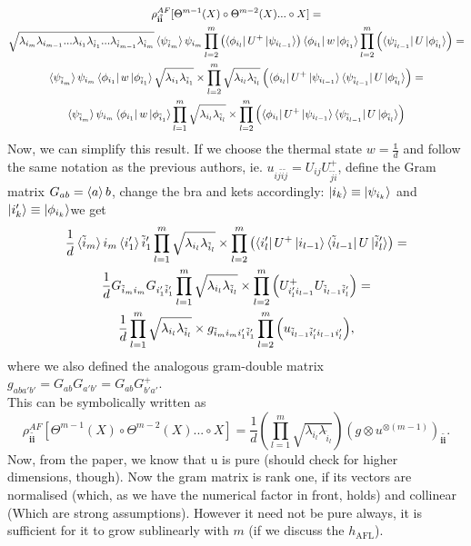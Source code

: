 \documentclass{article}
\newcommand{\afl}{h_{\text{AFL}}}
\begin{document}
\begin{multline}
\rho_{\mathbf{i}\mathbf{\tilde{i}}}^{AF}
[\Theta^{m-1}(X)\circ\Theta^{m-2}(X)...\circ X]
= \\
\sqrt{
\lambda_{i_m}\lambda_{i_{m-1}}...\lambda_{i_1}
\lambda_{\tilde{i}_1}...
\lambda_{\tilde{i}_{m-1}}
\lambda_{\tilde{i}_m}
}
\braket{\psi_{\tilde{i}_m}}{\psi_{i_m}}
\prod_{l=2}^m{\left(\bra{\phi_{i_l}}U^+\ket{\psi_{i_{l-1}}}\right)}
\bra{\phi_{i_1}}w\ket{\phi_{\tilde{i}_1}}
\prod_{l=2}^m{\left(\bra{\psi_{\tilde{i}_{l-1}}}U\ket{\phi_{\tilde{i}_l}}\right)} 
=\\
\braket{\psi_{\tilde{i}_m}}{\psi_{i_m}}
\bra{\phi_{i_1}}w\ket{\phi_{\tilde{i}_1}}
\sqrt{\lambda_{i_1}\lambda_{\tilde{i}_1}} \times\prod_{l=2}^m{\sqrt{\lambda_{i_l}\lambda_{\tilde{i}_l}}\left(\bra{\phi_{i_l}}U^+\ket{\psi_{i_{l-1}}}\bra{\psi_{\tilde{i}_{l-1}}}U\ket{\phi_{\tilde{i}_l}}\right)} = 
\\
\braket{\psi_{\tilde{i}_m}}{\psi_{i_m}}
\bra{\phi_{i_1}}w\ket{\phi_{\tilde{i}_1}}
\prod_{l=1}^m{\sqrt{\lambda_{i_l}\lambda_{\tilde{i}_l}}}\times\prod_{l=2}^m{\left(\bra{\phi_{i_l}}U^+\ket{\psi_{i_{l-1}}}\bra{\psi_{\tilde{i}_{l-1}}}U\ket{\phi_{\tilde{i}_l}}\right)}
\end{multline}
Now, we can simplify this result. If we choose the thermal state $w=\frac{\mathbb{1}}{d}$ and follow the same notation as the previous authors, ie. $u_{ij\tilde{i}\tilde{j}} = U_{ij}U^+_{\tilde{j}\tilde{i}}$, define the Gram matrix $G_{ab} = \braket{a}{b}$, change the bra and kets accordingly: $\ket{i_k}\equiv \ket{\psi_{i_{k}}}$ and $\ket{i_k'}\equiv \ket{\phi_{i_{k}}}$we get
\begin{multline}
\frac{1}{d}\braket{\tilde{i}_m}{i_m}
\braket{i_1'}{\tilde{i}_1'}
\prod_{l=1}^m{\sqrt{\lambda_{i_l}\lambda_{\tilde{i}_l}}}\times\prod_{l=2}^m{\left(\bra{i_l'}U^+\ket{i_{l-1}}\bra{\tilde{i}_{l-1}}U\ket{\tilde{i}_l'}\right)} = \\
\frac{1}{d}G_{\tilde{i}_mi_m}
G_{i_1'\tilde{i}_1'}
\prod_{l=1}^m{\sqrt{\lambda_{i_l}\lambda_{\tilde{i}_l}}}\times\prod_{l=2}^m{\left(U^+_{i_l'i_{l-1}}U_{\tilde{i}_{l-1}\tilde{i}_l'}\right)} = \\
\frac{1}{d}\prod_{l=1}^m{\sqrt{\lambda_{i_l}\lambda_{\tilde{i}_l}}}\times g_{\tilde{i}_mi_mi_1'\tilde{i}_1'}
\prod_{l=2}^m{\left(u_{\tilde{i}_{l-1}\tilde{i}_l'i_{l-1}i_l'}\right)},
\end{multline}
where we also defined the analogous gram-double matrix $g_{aba'b'} = G_{ab}G_{a'b'} = G_{ab}G^+_{b'a'}$. \\
This can be symbolically written as
\begin{equation}
\rho_{\mathbf{i}\mathbf{\tilde{i}}}^{AF}
[\Theta^{m-1}(X)\circ\Theta^{m-2}(X)...\circ X]
=\frac{1}{d}\left(\prod_{l=1}^m{\sqrt{\lambda_{i_l}\lambda_{\tilde{i}_l}}}\right)(g\otimes u^{\otimes(m-1)})_{\mathbf{i}\mathbf{\tilde{i}}}.
\end{equation}
Now, from the paper, we know that u is pure (should check for higher dimensions, though). Now the gram matrix is rank one, if its vectors are normalised (which, as we have the numerical factor in front, holds) and collinear (Which are strong assumptions). However it need not be pure always, it is sufficient for it to grow sublinearly with $m$ (if we discuss the $\afl$).
\end{document}
